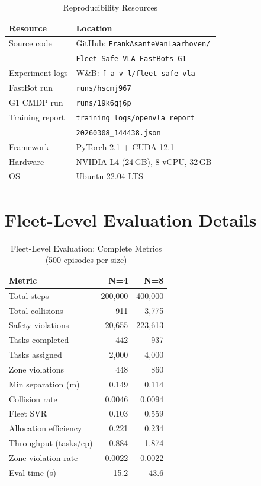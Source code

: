 \documentclass[conference]{IEEEtran}
\begin{document}
\begin{table}[h]
\centering
\caption{Reproducibility Resources}
\begin{tabular}{@{}ll@{}}
\toprule
\textbf{Resource} & \textbf{Location} \\
\midrule
Source code & GitHub: \texttt{FrankAsanteVanLaarhoven/} \\
           & \texttt{Fleet-Safe-VLA-FastBots-G1} \\
Experiment logs & W\&B: \texttt{f-a-v-l/fleet-safe-vla} \\
FastBot run & \texttt{runs/hscmj967} \\
G1 CMDP run & \texttt{runs/19k6gj6p} \\
Training report & \texttt{training\_logs/openvla\_report\_} \\
               & \texttt{20260308\_144438.json} \\
Framework & PyTorch 2.1 + CUDA 12.1 \\
Hardware & NVIDIA L4 (24\,GB), 8 vCPU, 32\,GB \\
OS & Ubuntu 22.04 LTS \\
\bottomrule
\end{tabular}
\end{table}

\section{Fleet-Level Evaluation Details}
\label{sec:supp_fleet}

\begin{table}[h]
\centering
\caption{Fleet-Level Evaluation: Complete Metrics (500 episodes per size)}
\begin{tabular}{@{}lrr@{}}
\toprule
\textbf{Metric} & \textbf{N=4} & \textbf{N=8} \\
\midrule
Total steps              & 200{,}000 & 400{,}000 \\
Total collisions         & 911       & 3{,}775   \\
Safety violations        & 20{,}655  & 223{,}613 \\
Tasks completed          & 442       & 937       \\
Tasks assigned           & 2{,}000   & 4{,}000   \\
Zone violations          & 448       & 860       \\
Min separation (m)       & 0.149     & 0.114     \\
Collision rate            & 0.0046    & 0.0094    \\
Fleet SVR                & 0.103     & 0.559     \\
Allocation efficiency    & 0.221     & 0.234     \\
Throughput (tasks/ep)    & 0.884     & 1.874     \\
Zone violation rate      & 0.0022    & 0.0022    \\
Eval time (s)            & 15.2      & 43.6      \\
\bottomrule
\end{tabular}
\end{table}
\end{document}
